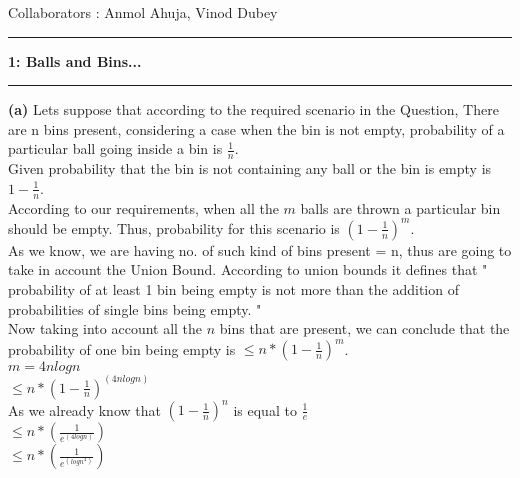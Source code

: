 \documentclass[11pt]{article}
\newcommand\question[2]{\vspace{.25in}\hrule\textbf{#1: #2}\vspace{.5em}\hrule\vspace{.10in}}
\renewcommand\part[1]{\vspace{.10in}\textbf{(#1)}}
\begin{document}
\raggedright
\newcommand\NAME{Aishwarya Asesh}  %
\newcommand\UID{u1063384}     %
\newcommand\HWNUM{5}              %



Collaborators : Anmol Ahuja, Vinod Dubey

\question{1}{Balls and Bins...}
\part{a}
Lets suppose that according to the required scenario in the Question, There are n bins present, considering a case when the bin is not empty, probability of a particular ball going inside a bin is $\frac{1}{n}$.\\ 
Given probability that the bin is not containing any ball or the bin is empty is $1-\frac{1}{n}$.\\
According to our requirements, when all the $m$ balls are thrown a particular bin should be empty. Thus, probability for this scenario is $(1-\frac{1}{n})^m$.\\
As we know, we are having no. of such kind of bins present = n, thus are going to take in account the Union Bound. According to union bounds it defines that " probability of at least 1 bin being empty is not more than the addition of probabilities of single bins being empty. " \\
Now taking into account all the $n$ bins that are present, we can conclude that the probability of one bin being empty is $\leq n* (1-\frac{1}{n})^m$.\\

$m=4nlogn$\\

$\leq n* (1-\frac{1}{n})^{(4nlogn)}$\\

As we already know that $(1-\frac{1}{n})^n$ is equal to $\frac{1}{e}$\\

$\leq n* (\frac{1}{e^{(4logn)}})$\\

$\leq n* (\frac{1}{e^{(logn^4)}})$\\
\end{document}
